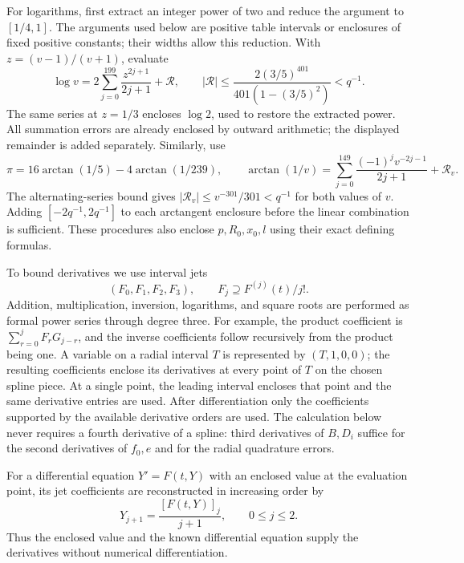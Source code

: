 For logarithms, first extract an integer power of two and reduce the
argument to $[1/4,1]$.  The arguments used below are positive table
intervals or enclosures of fixed positive constants; their widths
allow this reduction.  With $z=(v-1)/(v+1)$, evaluate
\begin{equation}\label{comp:logarithm}
 \log v=2\sum_{j=0}^{199}\frac{z^{2j+1}}{2j+1}+\mathcal R,
 \qquad |\mathcal R|
 \le\frac{2(3/5)^{401}}{401(1-(3/5)^2)}<q^{-1}.
\end{equation}
The same series at $z=1/3$ encloses $\log2$, used to restore the
extracted power.  All summation errors are already enclosed by
outward arithmetic; the displayed remainder is added separately.
Similarly, use
\begin{equation}\label{comp:pi}
 \pi=16\arctan(1/5)-4\arctan(1/239),\qquad
 \arctan(1/v)=\sum_{j=0}^{149}
             \frac{(-1)^jv^{-2j-1}}{2j+1}+\mathcal R_v.
\end{equation}
The alternating-series bound gives
$|\mathcal R_v|\le v^{-301}/301<q^{-1}$ for both values of $v$.
Adding $[-2q^{-1},2q^{-1}]$ to each arctangent enclosure before the
linear combination is sufficient.  These procedures also enclose
$p,R_0,x_0,l$ using their exact defining formulas.

To bound derivatives we use interval jets
\[
 (F_0,F_1,F_2,F_3),\qquad F_j\supseteq F^{(j)}(t)/j!.
\]
Addition, multiplication, inversion, logarithms, and square roots
are performed as formal power series through degree three.
For example, the product coefficient is
$\sum_{r=0}^jF_rG_{j-r}$, and the inverse coefficients follow
recursively from the product being one.  A variable on a radial
interval $T$ is represented by $(T,1,0,0)$; the resulting coefficients
enclose its derivatives at every point of $T$ on the chosen spline
piece.  At a single point, the leading interval encloses that point
and the same derivative entries are used.  After differentiation
only the coefficients supported by the available derivative orders
are used.  The calculation below never requires a fourth derivative
of a spline: third derivatives of $B,D_i$ suffice for the second
derivatives of $f_0,e$ and for the radial quadrature errors.

For a differential equation $Y'=F(t,Y)$ with an enclosed value at
the evaluation point,
its jet coefficients are reconstructed in increasing order by
\begin{equation}\label{comp:jet-ode}
 Y_{j+1}=\frac{[F(t,Y)]_j}{j+1},\qquad 0\le j\le2.
\end{equation}
Thus the enclosed value and the known differential equation supply
the derivatives without numerical differentiation.

